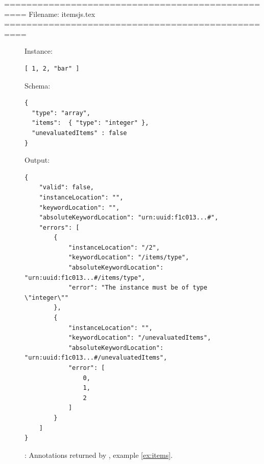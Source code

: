 ==================================================
Filename: itemsjs.tex
==================================================
\begin{figure}
\small

Instance:
\begin{querybox}{}
\begin{lstlisting}[style=querynonumbers]
[ 1, 2, "bar" ]
\end{lstlisting}
\end{querybox}

Schema:
\begin{querybox}{}
\begin{lstlisting}[style=query]
{
  "type": "array",
  "items":  { "type": "integer" }, 
  "unevaluatedItems" : false
}
\end{lstlisting}
\end{querybox}

Output:
\begin{querybox}{}
\begin{lstlisting}[style=query]
{
    "valid": false,
    "instanceLocation": "",
    "keywordLocation": "",
    "absoluteKeywordLocation": "urn:uuid:f1c013...#",
    "errors": [
        {
            "instanceLocation": "/2",
            "keywordLocation": "/items/type",
            "absoluteKeywordLocation": "urn:uuid:f1c013...#/items/type",
            "error": "The instance must be of type \"integer\""
        },
        {
            "instanceLocation": "",
            "keywordLocation": "/unevaluatedItems",
            "absoluteKeywordLocation": "urn:uuid:f1c013...#/unevaluatedItems",
            "error": [
                0,
                1,
                2
            ]
        }
    ]
}
\end{lstlisting}
\end{querybox}
\caption{{\qits}: Annotations returned by {\JSD}, example \ref{ex:items}.}
\label{fig:itemsjs}
\end{figure}



